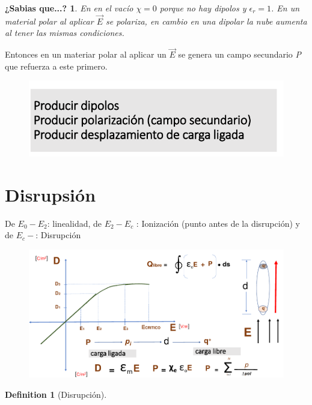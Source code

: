 \documentclass[12pt,letterpaper]{book}
\newtheorem{definition}{Definition}
\newtheorem{sabias}{¿Sabias que...?}[section]
\begin{document}
\begin{sabias}
En en el vacío $\chi =0$ porque no hay dipolos y $\epsilon _r=1$. En un material polar al aplicar $\vec{E}$ se polariza, en cambio en una dipolar  la nube aumenta al tener las mismas condiciones. 
\end{sabias}

Entonces en un materiar polar al aplicar un $\vec{E}$ se genera un campo secundario \textit{P} que refuerza a este primero.

\begin{figure}[H]
\centering
\includegraphics[width=1\linewidth]{figures/carFre6.png}
\caption{}
\label{carFre6}
\end{figure}
\vspace{0.2cm}


\section{Disrupsión}
De $E_0-E_2$: linealidad, de $E_2-E_{c}$ : Ionización (punto antes de la disrupción) y de $E_{c}-$: Disrupción
\begin{figure}[H]
\centering
\includegraphics[width=1\linewidth]{figures/dis.png}
\caption{}
\label{}
\end{figure}
\vspace{0.2cm}

\begin{definition}[Disrupción]

\end{definition}
\end{document}
